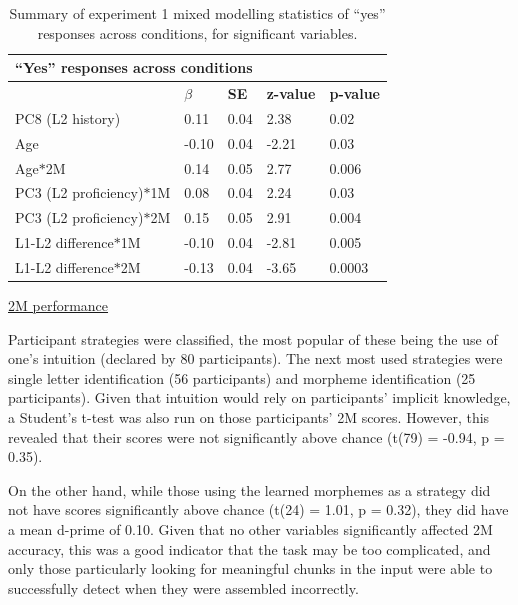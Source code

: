 \begin{table}[!htbp]
    \begin{center}
        \begin{tabular}{@{}lllll@{}}
            \toprule
            \multicolumn{5}{l}{\textbf{``Yes'' responses across conditions}} \\ \midrule
            & \textbf{$\beta$} & \textbf{SE} & \textbf{z-value} & \textbf{p-value} \\ \midrule
            PC8 (L2 history) & 0.11 & 0.04 & 2.38 & 0.02 \\ \midrule
            Age & -0.10 & 0.04 & -2.21 & 0.03 \\ \midrule
            Age$\ast$2M & 0.14 & 0.05 & 2.77 & 0.006 \\ \midrule
            PC3 (L2 proficiency)$\ast$1M & 0.08 & 0.04 & 2.24 & 0.03 \\ \midrule
            PC3 (L2 proficiency)$\ast$2M & 0.15 & 0.05 & 2.91 & 0.004 \\ \midrule
            L1-L2 difference$\ast$1M & -0.10 & 0.04 & -2.81 & 0.005 \\ \midrule
            L1-L2 difference$\ast$2M & -0.13 & 0.04 & -3.65 & 0.0003 \\ \bottomrule
        \end{tabular}
    \end{center}
    \caption{Summary of experiment 1 mixed modelling statistics of ``yes'' responses across conditions, for significant variables.}
    \label{exp1_yes_summary}
\end{table}
\break


\noindent
\underline{2M performance}

\noindent Participant strategies were classified, the most popular of these being the use of one's intuition (declared by 80 participants). The next most used strategies were single letter identification (56 participants) and morpheme identification (25 participants). Given that intuition would rely on participants' implicit knowledge, a Student's t-test was also run on those participants' 2M scores. However, this revealed that their scores were not significantly above chance (t(79) = -0.94, p = 0.35). 

On the other hand, while those using the learned morphemes as a strategy did not have scores significantly above chance (t(24) = 1.01, p = 0.32), they did have a mean d-prime of 0.10. Given that no other variables significantly affected 2M accuracy, this was a good indicator that the task may be too complicated, and only those particularly looking for meaningful chunks in the input were able to successfully detect when they were assembled incorrectly.